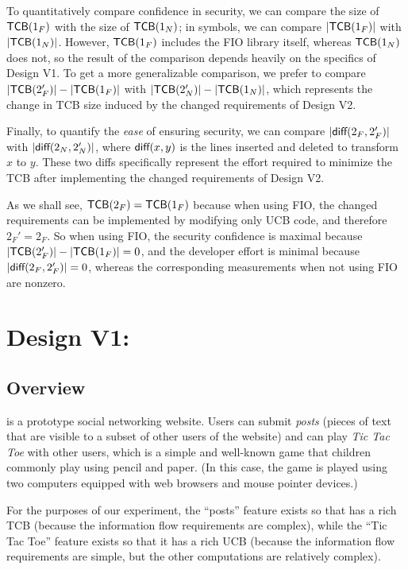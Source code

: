\begin{refsection}
To quantitatively compare confidence in security,
we can compare the size of $\textsf{TCB}(1_F)$ with the size of $\textsf{TCB}(1_N)$;
in symbols, we can compare $|\textsf{TCB}(1_F)|$ with $|\textsf{TCB}(1_N)|$.
%
However, $\textsf{TCB}(1_F)$ includes the FIO library itself,
whereas $\textsf{TCB}(1_N)$ does not,
so the result of the comparison depends heavily on the specifics of Design V1.
%
To get a more generalizable comparison,
we prefer to compare $|\textsf{TCB}(2_F')|-|\textsf{TCB}(1_F)|$ with $|\textsf{TCB}(2_N')|-|\textsf{TCB}(1_N)|$,
which represents the change in TCB size induced by the changed requirements of Design V2.

Finally, to quantify the \textit{ease} of ensuring security,
we can compare $|\textsf{diff}(2_F,2_F')|$ with $|\textsf{diff}(2_N,2_N')|$,
where $\textsf{diff}(x,y)$ is the lines inserted and deleted to transform $x$ to $y$.
%
These two diffs specifically represent the effort required to minimize the TCB after implementing the changed requirements of Design V2.

As we shall see,
$\textsf{TCB}(2_F)=\textsf{TCB}(1_F)$ because when using FIO,
the changed requirements can be implemented by modifying only UCB code,
and therefore $2_F'=2_F$.
%
So when using FIO,
the security confidence is maximal because $|\textsf{TCB}(2_F')|-|\textsf{TCB}(1_F)|=0$,
and the developer effort is minimal because $|\textsf{diff}(2_F,2_F')|=0$,
%
whereas the corresponding measurements when not using FIO are nonzero.

\fi

\section{Design V1: \myapp{}}

\subsection{Overview}

\myapp{} is a prototype social networking website.
%
Users can submit \textit{posts} (pieces of text that are visible to a subset of other users of the website)
and can play \textit{Tic Tac Toe} with other users,
which is a simple and well-known game that children commonly play using pencil and paper.
%
(In this case, the game is played using two computers equipped with web browsers and mouse pointer devices.)

For the purposes of our experiment,
the ``posts'' feature exists so that \myapp{} has a rich TCB
(because the information flow requirements are complex),
while the ``Tic Tac Toe'' feature exists so that it has a rich UCB
(because the information flow requirements are simple, but the other computations are relatively complex).


\end{refsection}
